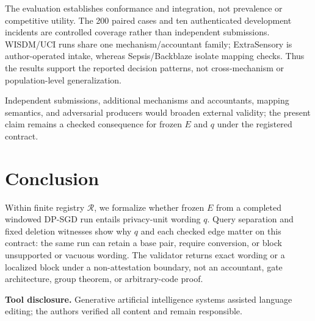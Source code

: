 \documentclass[letterpaper]{article} %
\begin{document}
The evaluation establishes conformance and integration, not prevalence or competitive utility. The 200 paired cases and ten authenticated development incidents are controlled coverage rather than independent submissions. WISDM/UCI runs share one mechanism/accountant family; ExtraSensory is author-operated intake, whereas Sepsis/Backblaze isolate mapping checks. Thus the results support the reported decision patterns, not cross-mechanism or population-level generalization.

Independent submissions, additional mechanisms and accountants, mapping semantics, and adversarial producers would broaden external validity; the present claim remains a checked consequence for frozen $E$ and $q$ under the registered contract.

\section{Conclusion}

Within finite registry $\mathcal R$, we formalize whether frozen $E$ from a completed windowed DP-SGD run entails privacy-unit wording $q$. Query separation and fixed deletion witnesses show why $q$ and each checked edge matter on this contract: the same run can retain a base pair, require conversion, or block unsupported or vacuous wording. The validator returns exact wording or a localized block under a non-attestation boundary, not an accountant, gate architecture, group theorem, or arbitrary-code proof.

\noindent\textbf{Tool disclosure.}
Generative artificial intelligence systems assisted language editing; the authors verified all content and remain responsible.


\end{document}
